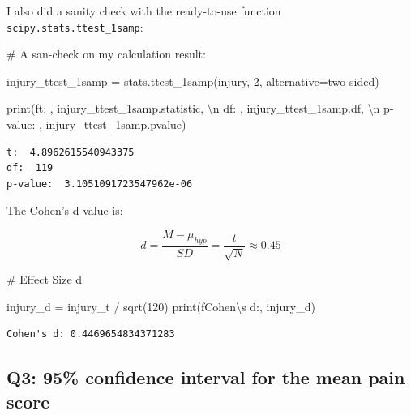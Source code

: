 \documentclass[
  a4paper,
  DIV=11,
  numbers=noendperiod]{scrartcl}
\newenvironment{Shaded}{\begin{snugshade}}{\end{snugshade}}
\newcommand{\BuiltInTok}[1]{\textcolor[rgb]{0.00,0.23,0.31}{#1}}
\newcommand{\CharTok}[1]{\textcolor[rgb]{0.13,0.47,0.30}{#1}}
\newcommand{\CommentTok}[1]{\textcolor[rgb]{0.37,0.37,0.37}{#1}}
\newcommand{\DecValTok}[1]{\textcolor[rgb]{0.68,0.00,0.00}{#1}}
\newcommand{\NormalTok}[1]{\textcolor[rgb]{0.00,0.23,0.31}{#1}}
\newcommand{\OperatorTok}[1]{\textcolor[rgb]{0.37,0.37,0.37}{#1}}
\newcommand{\SpecialStringTok}[1]{\textcolor[rgb]{0.13,0.47,0.30}{#1}}
\newcommand{\StringTok}[1]{\textcolor[rgb]{0.13,0.47,0.30}{#1}}
\begin{document}
I also did a sanity check with the ready-to-use function
\texttt{scipy.stats.ttest\_1samp}:

\begin{Shaded}
\begin{Highlighting}[numbers=left,,]
\CommentTok{\# A san{-}check on my calculation result: }

\NormalTok{injury\_ttest\_1samp }\OperatorTok{=}\NormalTok{ stats.ttest\_1samp(injury, }\DecValTok{2}\NormalTok{, alternative}\OperatorTok{=}\StringTok{\textquotesingle{}two{-}sided\textquotesingle{}}\NormalTok{)}

\BuiltInTok{print}\NormalTok{(}\SpecialStringTok{f\textquotesingle{}t: \textquotesingle{}}\NormalTok{, injury\_ttest\_1samp.statistic, }\StringTok{\textquotesingle{}}\CharTok{\textbackslash{}n}\StringTok{\textquotesingle{}}
      \StringTok{\textquotesingle{}df: \textquotesingle{}}\NormalTok{, injury\_ttest\_1samp.df, }\StringTok{\textquotesingle{}}\CharTok{\textbackslash{}n}\StringTok{\textquotesingle{}}
      \StringTok{\textquotesingle{}p{-}value: \textquotesingle{}}\NormalTok{, injury\_ttest\_1samp.pvalue)}
\end{Highlighting}
\end{Shaded}

\begin{verbatim}
t:  4.8962615540943375 
df:  119 
p-value:  3.1051091723547962e-06
\end{verbatim}

The Cohen's d value is:

\[
d = \frac{M - \mu_{hyp}}{SD} = \frac{t}{\sqrt{N}} \approx 0.45
\]

\begin{Shaded}
\begin{Highlighting}[numbers=left,,]
\CommentTok{\# Effect Size d}

\NormalTok{injury\_d }\OperatorTok{=}\NormalTok{ injury\_t }\OperatorTok{/}\NormalTok{ sqrt(}\DecValTok{120}\NormalTok{)}
\BuiltInTok{print}\NormalTok{(}\SpecialStringTok{f\textquotesingle{}Cohen}\CharTok{\textbackslash{}\textquotesingle{}}\SpecialStringTok{s d:\textquotesingle{}}\NormalTok{, injury\_d)}
\end{Highlighting}
\end{Shaded}

\begin{verbatim}
Cohen's d: 0.4469654834371283
\end{verbatim}

\subsection{Q3: 95\% confidence interval for the mean pain
score}\label{q3-95-confidence-interval-for-the-mean-pain-score}
\end{document}
